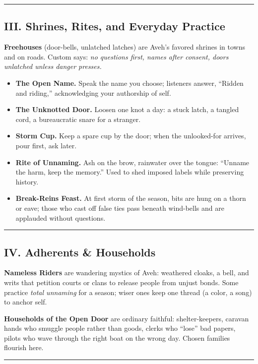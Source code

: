 \documentclass[11pt,letterpaper]{article}
\begin{document}
\medskip\hrule\medskip

\subsection{III. Shrines, Rites, and Everyday Practice}

\textbf{Freehouses} (door-bells, unlatched latches) are Aveh's favored shrines in towns and on roads. Custom says: \emph{no questions first, names after consent, doors unlatched unless danger presses.}

\begin{itemize}[leftmargin=*]
  \item \textbf{The Open Name.} Speak the name you choose; listeners answer, ``Ridden and riding,'' acknowledging your authorship of self.
  \item \textbf{The Unknotted Door.} Loosen one knot a day: a stuck latch, a tangled cord, a bureaucratic snare for a stranger.
  \item \textbf{Storm Cup.} Keep a spare cup by the door; when the unlooked-for arrives, pour first, ask later.
  \item \textbf{Rite of Unnaming.} Ash on the brow, rainwater over the tongue: ``Unname the harm, keep the memory.'' Used to shed imposed labels while preserving history.
  \item \textbf{Break-Reins Feast.} At first storm of the season, bits are hung on a thorn or eave; those who cast off false ties pass beneath wind-bells and are applauded without questions.
\end{itemize}

\medskip\hrule\medskip

\subsection{IV. Adherents \& Households}

\textbf{Nameless Riders} are wandering mystics of Aveh: weathered cloaks, a bell, and writs that petition courts or clans to release people from unjust bonds. Some practice \emph{total unnaming} for a season; wiser ones keep one thread (a color, a song) to anchor self.

\textbf{Households of the Open Door} are ordinary faithful: shelter-keepers, caravan hands who smuggle people rather than goods, clerks who ``lose'' bad papers, pilots who wave through the right boat on the wrong day. Chosen families flourish here.

\medskip\hrule\medskip
\end{document}
